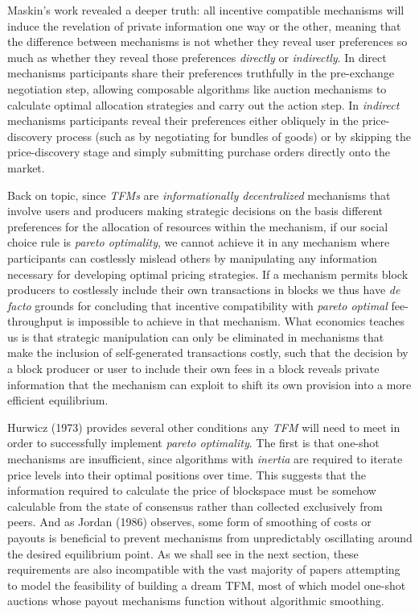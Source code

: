 Maskin's work revealed a deeper truth: all incentive compatible mechanisms will induce the revelation of private information one way or the other, meaning that the difference between mechanisms is not whether they reveal user preferences so much as whether they reveal those preferences \textit{directly} or \textit{indirectly}. In direct mechanisms participants share their preferences truthfully in the pre-exchange negotiation step, allowing composable algorithms like auction mechanisms to calculate optimal allocation strategies and carry out the action step. In \textit{indirect} mechanisms participants reveal their preferences either obliquely in the price-discovery process (such as by negotiating for bundles of goods) or by skipping the price-discovery stage and simply submitting purchase orders directly onto the market.

Back on topic, since \textit{TFMs} are \textit{informationally decentralized} mechanisms that involve users and producers making strategic decisions on the basis different preferences for the allocation of resources within the mechanism, if our social choice rule is \textit{pareto optimality}, we cannot achieve it in any mechanism where participants can costlessly mislead others by manipulating any information necessary for developing optimal pricing strategies. If a mechanism permits block producers to costlessly include their own transactions in blocks we thus have \textit{de facto} grounds for concluding that incentive compatibility with \textit{pareto optimal} fee-throughput is impossible to achieve in that mechanism. What economics teaches us is that strategic manipulation can only be eliminated in mechanisms that make the inclusion of self-generated transactions costly, such that the decision by a block producer or user to include their own fees in a block reveals private information that the mechanism can exploit to shift its own provision into a more efficient equilibrium.

Hurwicz (1973) provides several other conditions any \textit{TFM} will need to meet in order to successfully implement \textit{pareto optimality}. The first is that one-shot mechanisms are insufficient, since algorithms with \textit{inertia} are required to iterate price levels into their optimal positions over time. This suggests that the information required to calculate the price of blockspace must be somehow calculable from the state of consensus rather than collected exclusively from peers. And as Jordan (1986) observes, some form of smoothing of costs or payouts is beneficial to prevent mechanisms from unpredictably oscillating around the desired equilibrium point. As we shall see in the next section, these requirements are also incompatible with the vast majority of papers attempting to model the feasibility of building a dream TFM, most of which model one-shot auctions whose payout mechanisms function without algorithmic smoothing.

